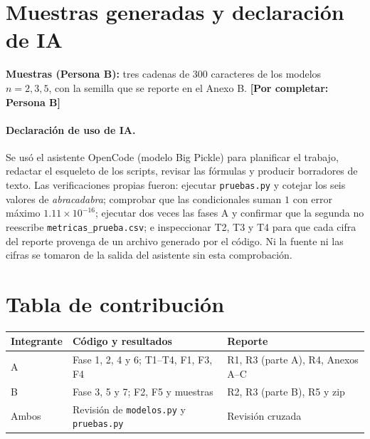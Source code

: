 \documentclass[11pt,letterpaper]{article}
\begin{document}
\section{Muestras generadas y declaración de IA}

\textbf{Muestras (Persona B):} tres cadenas de 300 caracteres de los modelos
$n=2,3,5$, con la semilla que se reporte en el Anexo B.
\textbf{[Por completar: Persona B]}

\paragraph{Declaración de uso de IA.}
Se usó el asistente OpenCode (modelo Big Pickle) para planificar el trabajo,
redactar el esqueleto de los scripts, revisar las fórmulas y producir borradores
de texto. Las verificaciones propias fueron: ejecutar \texttt{pruebas.py} y
cotejar los seis valores de \emph{abracadabra}; comprobar que las condicionales
suman $1$ con error máximo $1.11\times10^{-16}$; ejecutar dos veces las fases A
y confirmar que la segunda no reescribe \texttt{metricas\_prueba.csv}; e
inspeccionar T2, T3 y T4 para que cada cifra del reporte provenga de un archivo
generado por el código. Ni la fuente ni las cifras se tomaron de la salida del
asistente sin esta comprobación.

\section*{Tabla de contribución}

\begin{center}
\begin{tabular}{lll}
\hline
Integrante & Código y resultados & Reporte \\
\hline
A & Fase 1, 2, 4 y 6; T1--T4, F1, F3, F4 & R1, R3 (parte A), R4, Anexos A--C \\
B & Fase 3, 5 y 7; F2, F5 y muestras & R2, R3 (parte B), R5 y zip \\
Ambos & Revisión de \texttt{modelos.py} y \texttt{pruebas.py} & Revisión cruzada \\
\hline
\end{tabular}
\end{center}
\end{document}
